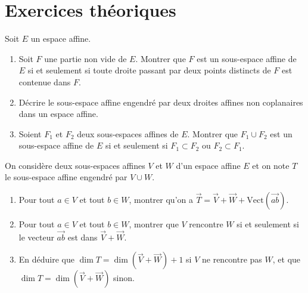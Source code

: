 \section{Exercices th\'eoriques}
\be
Soit $E$ un espace affine.
\begin{enumerate}
  \item Soit $F$ une partie non vide de $E$. Montrer que $F$ est un sous-espace affine de $E$ si et seulement si toute droite passant par deux points distincts de $F$ est contenue dans $F$.
  \item D\'ecrire le sous-espace affine engendr\'e par deux droites affines non coplanaires dans un espace affine.
  \item Soient $F_1$ et $F_2$ deux sous-espaces affines de $E$. Montrer que $F_1\cup F_2$ est un sous-espace affine de $E$ si et seulement si $F_1\subset F_2$ ou $F_2\subset F_1$.
\end{enumerate}
\ee
\medskip
\be
On consid\`ere deux sous-espaces affines $V$ et $W$ d'un espace affine $E$ et on note $T$ le sous-espace affine
   engendr\'e par $V\cup W$.
   \begin{enumerate}
    \item Pour tout $a\in V$ et tout $b\in W$, montrer qu'on a $\overrightarrow{T}=\overrightarrow{V}+\overrightarrow{W}+\mathrm{Vect}(\overrightarrow{ab})$.
    \item Pour tout $a\in V$ et tout $b\in W$, montrer que $V$ rencontre $W$ si et seulement si le vecteur $\overrightarrow{ab}$ est dans
    $\overrightarrow{V}+\overrightarrow{W}$.
    \item En d\'eduire que $\dim T=\dim(\overrightarrow{V} + \overrightarrow{W})+1$ si $V$ ne rencontre pas $W$, et que $\dim T=\dim(\overrightarrow{V}+\overrightarrow{W})$ sinon.
   \end{enumerate}
\ee
\newpage

